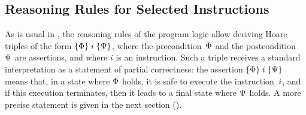 \subsection{Reasoning Rules for Selected Instructions}
\label{sec:reasoning}

As is usual in \SL, the reasoning rules of the program logic allow deriving
Hoare triples of the form $\{\Phi\}\;i\;\{\Psi\}$, where the
precondition~$\Phi$ and the postcondition~$\Psi$ are assertions,
and where $i$ is an instruction.
Such a triple receives a standard interpretation as a statement of partial
correctness: the assertion $\{\Phi\}\;i\;\{\Psi\}$ means that, in a state
where $\Phi$ holds, it is safe to execute the instruction~$i$, and if
this execution terminates, then it leads to a final state where $\Psi$ holds.
A more precise statement is given in the next section ().

